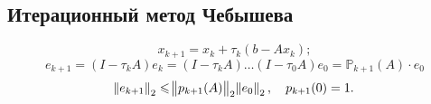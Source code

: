 \subsection{Итерационный метод Чебышева}

\[
    x_{k + 1} = x_k + \tau_k (b - A x_k);
\]
\[
    e_{k + 1} = (I - \tau_k A) e_k = (I - \tau_k A) \dots (I - \tau_0 A) e_0
    = \mathbb{P}_{k + 1}(A) \cdot e_0
\]
\[
    \norm{e_{k + 1}}_2 \leqslant \norm{p_{k + 1}(A)}_2 \norm{e_0}_2,
    \quad p_{k + 1}(0) = 1.
\]
